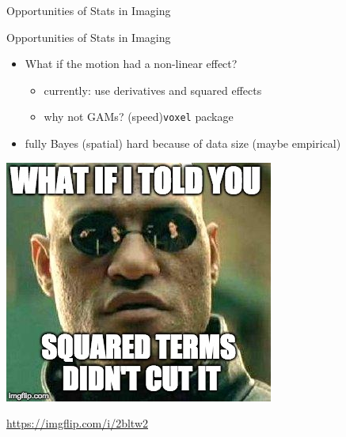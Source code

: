 \documentclass[ignorenonframetext,]{beamer}
\providecommand{\tightlist}{%
  \setlength{\itemsep}{0pt}\setlength{\parskip}{0pt}}
\begin{document}
\begin{frame}[fragile]
\begin{block}{Opportunities of Stats in Imaging}
\end{block}

\begin{block}{Opportunities of Stats in Imaging}

\hypertarget{left_col}{}
\begin{itemize}
\tightlist
\item
  What if the motion had a non-linear effect?

  \begin{itemize}
  \tightlist
  \item
    currently: use derivatives and squared effects
  \item
    why not GAMs? (speed)\texttt{voxel} package
  \end{itemize}
\item
  fully Bayes (spatial) hard because of data size (maybe empirical)
\end{itemize}

\hypertarget{right_col}{}
\includegraphics[width=1.2\linewidth]{figure/nonlinear}

\url{https://imgflip.com/i/2bltw2}

\end{block}

\end{frame}
\end{document}
